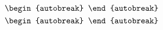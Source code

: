 \documentclass{article}
\begin{document}
\begin{align}
  \begin{autobreak}
    
  \end{autobreak}
  \\
  \begin{autobreak}
    
  \end{autobreak}
\end{align}
\end{document}

